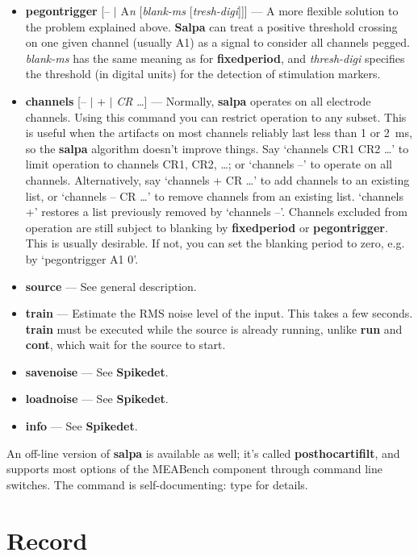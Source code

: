 \documentclass[12pt,oneside]{book}
\def\meabench{{MEABench}\xspace}
\def\prog#1{{\bf #1}}
\def\cmd#1{{\bf #1}}
\def\arg#1{{\it #1}}
\begin{document}
\begin{itemize}
(\emph{blank-ms}). Typical values for \emph{blank-ms} would be one or
two milliseconds. \prog{Salpa} will kick in after that and determine
the end of the irrepairable part of the artifact using the asymmetry
(deviation) test as usual.
\item \cmd{pegontrigger} [-- $|$ A\arg{n} [\arg{blank-ms} [\arg{tresh-digi}]]] --- A more
flexible solution to the problem explained above. \prog{Salpa} can treat
a positive threshold crossing on one given channel (usually A1) as a
signal to consider all channels pegged. \emph{blank-ms} has the same
meaning as for \cmd{fixedperiod}, and \emph{thresh-digi} specifies the
threshold (in digital units) for the detection of stimulation markers.
\item \cmd{channels} [-- $|$ + $|$ \arg{CR} \ldots] --- Normally, \prog{salpa}
operates on all electrode channels. Using this command you can
restrict operation to any subset. This is useful when the artifacts on
most channels reliably  last less than 1 or 2~ms, so the \prog{salpa}
algorithm doesn't improve things. Say `channels CR1 CR2 \ldots' to limit
operation to channels CR1, CR2, \ldots; or `channels --' to operate on
all channels. Alternatively, say `channels + CR \ldots' to add
channels to an existing list, or `channels -- CR \ldots' to remove
channels from an existing list. `channels +' restores a list
previously removed by `channels --'. Channels excluded from operation
are still subject to blanking by \cmd{fixedperiod} or
\cmd{pegontrigger}. This is usually desirable. If not, you can set the
blanking period to zero, e.g. by `pegontrigger A1 0'.
\item \cmd{source} --- See general description.
\item \cmd{train} --- Estimate the RMS noise level of the input. This
takes a few seconds. \cmd{train} must be executed while the source is
already running, unlike \cmd{run} and \cmd{cont}, which wait for the
source to start.
\item \cmd{savenoise} --- See \prog{Spikedet}.
\item \cmd{loadnoise} --- See \prog{Spikedet}.
\item \cmd{info} --- See \prog{Spikedet}.
\end{itemize}
An off-line version of \prog{salpa} is available as well; it's called
\prog{posthocartifilt}, and supports most options of the \meabench
component through command line switches. The command is
self-documenting: type  for details.


\section{Record}
\end{document}

